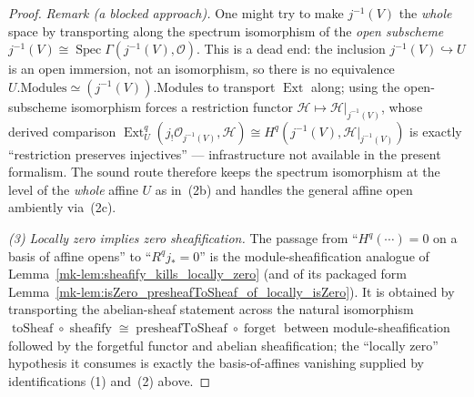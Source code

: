 \begin{proof}
  \textit{Remark (a blocked approach).} One might try to make \(j^{-1}(V)\) the \emph{whole} space by
  transporting along the spectrum isomorphism of the \emph{open subscheme}
  \(j^{-1}(V) \cong \operatorname{Spec}\Gamma(j^{-1}(V), \mathcal{O})\). This is a dead end: the
  inclusion \(j^{-1}(V) \hookrightarrow U\) is an open immersion, not an isomorphism, so there is no
  equivalence \(U.\mathrm{Modules} \simeq (j^{-1}(V)).\mathrm{Modules}\) to transport
  \(\operatorname{Ext}\) along; using the open-subscheme isomorphism forces a restriction functor
  \(\mathcal{H} \mapsto \mathcal{H}|_{j^{-1}(V)}\), whose derived comparison
  \(\operatorname{Ext}^q_{U}(j_!\mathcal{O}_{j^{-1}(V)}, \mathcal{H}) \cong H^q(j^{-1}(V),
  \mathcal{H}|_{j^{-1}(V)})\) is exactly ``restriction preserves injectives'' --- infrastructure not
  available in the present formalism. The sound route therefore keeps the spectrum isomorphism at the
  level of the \emph{whole} affine \(U\) as in~(2b) and handles the general affine open ambiently
  via~(2c).

  \emph{(3) Locally zero implies zero sheafification.} The
  passage from ``\(H^q(\cdots) = 0\) on a basis of affine opens'' to ``\(R^q j_* = 0\)'' is the
  module-sheafification analogue of Lemma~\ref{mk-lem:sheafify_kills_locally_zero} (and of its packaged
  form Lemma~\ref{mk-lem:isZero_presheafToSheaf_of_locally_isZero}). It is obtained by transporting the
  abelian-sheaf statement across the natural isomorphism
  \(\operatorname{toSheaf} \circ \operatorname{sheafify} \cong \operatorname{presheafToSheaf} \circ
  \operatorname{forget}\) between module-sheafification followed by the forgetful functor and abelian
  sheafification; the ``locally zero'' hypothesis it consumes is exactly the basis-of-affines vanishing
  supplied by identifications (1) and~(2) above.
\end{proof}

